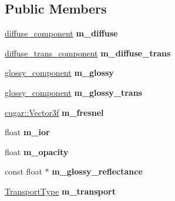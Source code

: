 \subsection*{Public Members}
\begin{DoxyCompactItemize}
\item 
\mbox{\label{struct_bsdf_a07cbf725e97463d0a33d88aca41e4e99}} 
\hyperlink{structcugar_1_1_lambert_bsdf}{diffuse\+\_\+component} {\bfseries m\+\_\+diffuse}
\item 
\mbox{\label{struct_bsdf_adabef4ad1d3d36d28fcc917d9f4fe3de}} 
\hyperlink{structcugar_1_1_lambert_trans_bsdf}{diffuse\+\_\+trans\+\_\+component} {\bfseries m\+\_\+diffuse\+\_\+trans}
\item 
\mbox{\label{struct_bsdf_a486681b36b7838e4e29af1ab7727aa12}} 
\hyperlink{structcugar_1_1_g_g_x_smith_bsdf}{glossy\+\_\+component} {\bfseries m\+\_\+glossy}
\item 
\mbox{\label{struct_bsdf_a48195915bd4bdbed355ccb6cd6921cf5}} 
\hyperlink{structcugar_1_1_g_g_x_smith_bsdf}{glossy\+\_\+component} {\bfseries m\+\_\+glossy\+\_\+trans}
\item 
\mbox{\label{struct_bsdf_a1fef34fd64df70b96e39d368efc66dc6}} 
\hyperlink{structcugar_1_1_vector}{cugar\+::\+Vector3f} {\bfseries m\+\_\+fresnel}
\item 
\mbox{\label{struct_bsdf_a6be949f0571a3f7f854b0fd4b5f8708e}} 
float {\bfseries m\+\_\+ior}
\item 
\mbox{\label{struct_bsdf_adc6015bf971d0de0745116dd3d343f53}} 
float {\bfseries m\+\_\+opacity}
\item 
\mbox{\label{struct_bsdf_a0c4968259fa76abd54fc31021a413bb5}} 
const float $\ast$ {\bfseries m\+\_\+glossy\+\_\+reflectance}
\item 
\mbox{\label{struct_bsdf_a4be56c3587da98009cdaa6e7732856dd}} 
\hyperlink{group___b_s_d_f_module_gaca1e72535e7f260e54ed8bbf984dade9}{Transport\+Type} {\bfseries m\+\_\+transport}
\end{DoxyCompactItemize}


